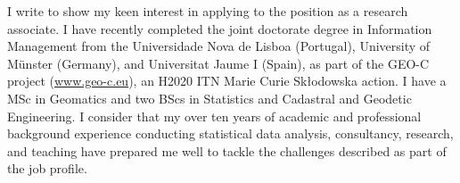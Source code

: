 \documentclass[11pt, a4paper]{awesome-cv}
\begin{document}
\makecvheader[R]


\makelettertitle

\begin{cvletter}
I write to show my keen interest in applying to the position as a research associate. I have recently completed the joint doctorate degree in Information Management from the Universidade Nova de Lisboa (Portugal), University of Münster (Germany), and Universitat Jaume I (Spain), as part of the GEO-C project (\url{www.geo-c.eu}), an H2020 ITN Marie Curie Skłodowska action. I have a MSc in Geomatics and two BScs in Statistics and Cadastral and Geodetic Engineering. I consider that my over ten years of academic and professional background experience conducting statistical data analysis, consultancy, research, and teaching have prepared me well to tackle the challenges described as part of the job profile.\par

\end{cvletter}
\end{document}
